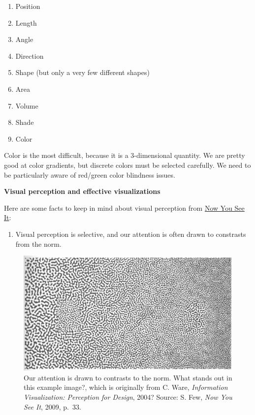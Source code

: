 \documentclass[
  letterpaper,
  DIV=11,
  numbers=noendperiod]{scrreprt}
\providecommand{\tightlist}{%
  \setlength{\itemsep}{0pt}\setlength{\parskip}{0pt}}\usepackage{longtable,booktabs,array}
\begin{document}
\begin{enumerate}
\def\labelenumi{\arabic{enumi}.}
\tightlist
\item
  Position
\item
  Length
\item
  Angle
\item
  Direction
\item
  Shape (but only a very few different shapes)
\item
  Area
\item
  Volume
\item
  Shade
\item
  Color
\end{enumerate}

Color is the most difficult, because it is a 3-dimensional quantity. We
are pretty good at color gradients, but discrete colors must be selected
carefully. We need to be particularly aware of red/green color blindness
issues.

\textbf{Visual perception and effective visualizations}

Here are some facts to keep in mind about visual perception from
\href{https://www.amazon.com/Now-You-See-Visualization-Quantitative/dp/0970601980}{Now
You See It}:

\begin{enumerate}
\def\labelenumi{\arabic{enumi}.}
\tightlist
\item
  Visual perception is selective, and our attention is often drawn to
  constrasts from the norm.
\end{enumerate}

\begin{figure}[H]

{\centering \includegraphics[width=1\textwidth,height=\textheight]{src/../images/contrast.png}

}

\caption{Our attention is drawn to contrasts to the norm. What stands
out in this example image?, which is originally from C. Ware,
\emph{Information Visualization: Perception for Design}, 2004? Source:
S. Few, \emph{Now You See It}, 2009, p.~33.}

\end{figure}%
\end{document}
